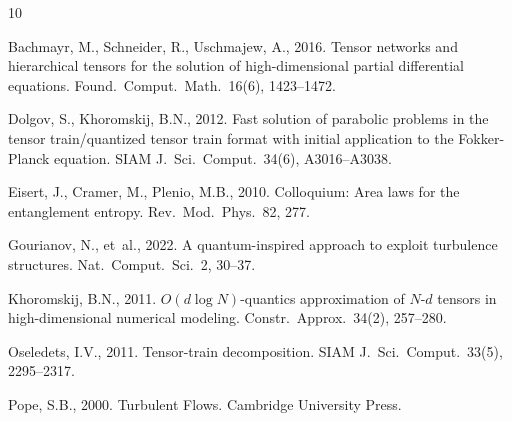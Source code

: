 \documentclass[preprint,12pt,authoryear]{elsarticle}
\theoremstyle{definition}
\begin{document}

\begin{thebibliography}{10}

Bachmayr, M., Schneider, R., Uschmajew, A., 2016.
\newblock Tensor networks and hierarchical tensors for the solution of high-dimensional partial differential equations.
\newblock Found.\ Comput.\ Math.\ 16(6), 1423--1472.

Dolgov, S., Khoromskij, B.N., 2012.
\newblock Fast solution of parabolic problems in the tensor train/quantized tensor train format with initial application to the Fokker-Planck equation.
\newblock SIAM J.\ Sci.\ Comput.\ 34(6), A3016--A3038.

Eisert, J., Cramer, M., Plenio, M.B., 2010.
\newblock Colloquium: Area laws for the entanglement entropy.
\newblock Rev.\ Mod.\ Phys.\ 82, 277.

Gourianov, N., et~al., 2022.
\newblock A quantum-inspired approach to exploit turbulence structures.
\newblock Nat.\ Comput.\ Sci.\ 2, 30--37.

Khoromskij, B.N., 2011.
\newblock $O(d \log N)$-quantics approximation of $N$-$d$ tensors in high-dimensional numerical modeling.
\newblock Constr.\ Approx.\ 34(2), 257--280.

Oseledets, I.V., 2011.
\newblock Tensor-train decomposition.
\newblock SIAM J.\ Sci.\ Comput.\ 33(5), 2295--2317.

Pope, S.B., 2000.
\newblock Turbulent Flows.
\newblock Cambridge University Press.

\end{thebibliography}
\end{document}
